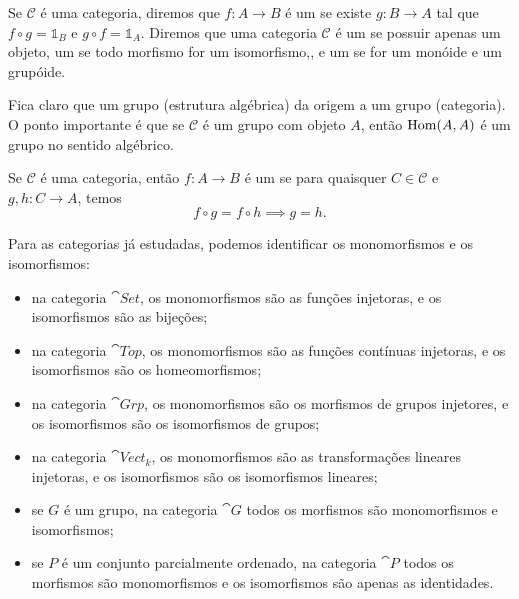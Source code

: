 \begin{definicao}
    Se $\mathcal{C}$ é uma categoria, diremos que $f \colon A \to B$ é um  se existe $g \colon B \to A$ tal que $f \circ g = \mathbb{1}_B$ e $g \circ f = \mathbb{1}_A$. Diremos que uma categoria $\mathcal{C}$ é um  se possuir apenas um objeto, um  se todo morfismo for um isomorfismo,, e um  se for um monóide e um grupóide.
\end{definicao}

Fica claro que um grupo (estrutura algébrica) da origem a um grupo (categoria). O ponto importante é que se $\mathcal{C}$ é um grupo com objeto $A$, então $\operatorname{Hom}(A,A)$ é um grupo no sentido algébrico.

\begin{definicao}
    Se $\mathcal{C}$ é uma categoria, então $f \colon A \to B$ é um  se para quaisquer $C \in \mathcal{C}$ e $g, h \colon C \to A$, temos \begin{equation}
        f \circ g = f \circ h \implies g = h.
    \end{equation}
\end{definicao}

\begin{exemplo}
    Para as categorias já estudadas, podemos identificar os monomorfismos e os isomorfismos: \begin{itemize}
        \item na categoria $\cat{Set}$, os monomorfismos são as funções injetoras, e os isomorfismos são as bijeções;
        \item na categoria $\cat{Top}$, os monomorfismos são as funções contínuas injetoras, e os isomorfismos são os homeomorfismos;
        \item na categoria $\cat{Grp}$, os monomorfismos são os morfismos de grupos injetores, e os isomorfismos são os isomorfismos de grupos;
        \item na categoria $\cat{Vect}_k$, os monomorfismos são as transformações lineares injetoras, e os isomorfismos são os isomorfismos lineares;
        \item se $G$ é um grupo, na categoria $\cat{G}$ todos os morfismos são monomorfismos e isomorfismos;
        \item se $P$ é um conjunto parcialmente ordenado, na categoria $\cat{P}$ todos os morfismos são monomorfismos e os isomorfismos são apenas as identidades.
    \end{itemize}
\end{exemplo}

